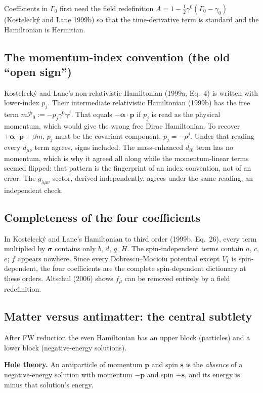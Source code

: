 \documentclass[11pt,a4paper]{article}
\newcommand{\sig}{\bm{\sigma}}
\begin{document}
Coefficients in $\Gamma_0$ first need the field redefinition
$A=1-\tfrac12\gamma^0(\Gamma_0-\gamma_0)$ (Kostelecký and Lane 1999b) so
that the time-derivative term is standard and the Hamiltonian is
Hermitian.

\subsection{The momentum-index convention (the old ``open sign'')}

Kostelecký and Lane's non-relativistic Hamiltonian (1999a, Eq.~4) is
written with lower-index $p_j$. Their intermediate relativistic
Hamiltonian (1999b) has the free term $m\mathcal P_0:=-p_j\gamma^0\gamma^j$.
That equals $-\bm\alpha\cdot\mathbf p$ if $p_j$ is read as the physical
momentum, which would give the wrong free Dirac Hamiltonian. To recover
$+\bm\alpha\cdot\mathbf p+\beta m$, $p_j$ must be the covariant component,
$p_j=-p^j$. Under that reading every $d_{\mu\nu}$ term agrees, signs
included. The mass-enhanced $d_{i0}$ term has no momentum, which is why it
agreed all along while the momentum-linear terms seemed flipped: that
pattern is the fingerprint of an index convention, not of an error. The
$g_{\lambda\mu\nu}$ sector, derived independently, agrees under the same
reading, an independent check.

\subsection{Completeness of the four coefficients}

In Kostelecký and Lane's Hamiltonian to third order (1999b, Eq.~26),
every term multiplied by $\sig$ contains only $b$, $d$, $g$, $H$. The
spin-independent terms contain $a$, $c$, $e$; $f$ appears nowhere. Since
every Dobrescu--Mocioiu potential except $V_1$ is spin-dependent, the four
coefficients are the complete spin-dependent dictionary at these orders.
Altschul (2006) shows $f_\mu$ can be removed entirely by a field
redefinition.

\subsection{Matter versus antimatter: the central subtlety}
\label{sec:antimatter}

After FW reduction the even Hamiltonian has an upper block (particles)
and a lower block (negative-energy solutions).

\textbf{Hole theory.} An antiparticle of momentum $\mathbf p$ and spin
$\mathbf s$ is the \emph{absence} of a negative-energy solution with
momentum $-\mathbf p$ and spin $-\mathbf s$, and its energy is minus that
solution's energy.
\end{document}
